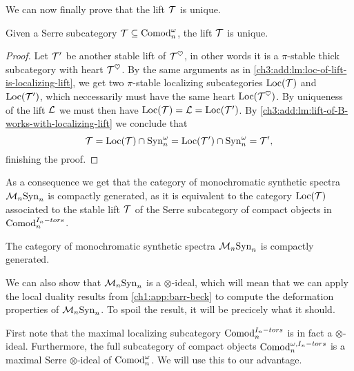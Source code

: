 We can now finally prove that the lift $\mathcal{T}$ is unique. 

\begin{theorem}
    \label{ch3:add:thm:uniqueness-of-lift}
    Given a Serre subcategory $\mathcal{T}\subseteq \mathrm{Comod}_n^\omega$, the lift $\mathcal{T}$ is unique. 
\end{theorem}
\begin{proof}
    Let $\mathcal{T}'$ be another stable lift of $\mathcal{T}^\heartsuit$, in other words it is a $\pi$-stable thick subcategory with heart $\mathcal{T}^\heartsuit$. By the same arguments as in \cref{ch3:add:lm:loc-of-lift-is-localizing-lift}, we get two $\pi$-stable localizing subcategories $\operatorname{Loc}(\mathcal{T})$ and $\operatorname{Loc}(\mathcal{T}')$, which neccessarily must have the same heart $\operatorname{Loc}(\mathcal{T}^\heartsuit)$. By uniqueness of the lift $\mathcal{L}$ we must then have $\operatorname{Loc}(\mathcal{T}) = \mathcal{L} = \operatorname{Loc}(\mathcal{T}')$. By \cref{ch3:add:lm:lift-of-B-works-with-localizing-lift} we conclude that 
    \[\mathcal{T} = \operatorname{Loc}(\mathcal{T})\cap \mathrm{Syn}_{n}^\omega = \operatorname{Loc}(\mathcal{T}')\cap \mathrm{Syn}_{n}^\omega = \mathcal{T}',\]
    finishing the proof. 
\end{proof}

As a consequence we get that the category of monochromatic synthetic spectra $\mathcal{M}_{n}\mathrm{Syn}_n$ is compactly generated, as it is equivalent to the category $\operatorname{Loc}(\mathcal{T})$ associated to the stable lift $\mathcal{T}$ of the Serre subcategory of compact objects in $\mathrm{Comod}_n^{I_n-tors}$. 

\begin{corollary}
    The category of monochromatic synthetic spectra $\mathcal{M}_{n}\mathrm{Syn}_n$ is compactly generated. 
\end{corollary}

We can also show that $\mathcal{M}_{n}\mathrm{Syn}_n$ is a $\otimes$-ideal, which will mean that we can apply the local duality results from \cref{ch1:app:barr-beck} to compute the deformation properties of $\mathcal{M}_{n}\mathrm{Syn}_n$. To spoil the result, it will be precicely what it should. 

First note that the maximal localizing subcategory $\mathrm{Comod}_n^{I_n-tors}$ is in fact a $\otimes$-ideal. Furthermore, the full subcategory of compact objects $\mathrm{Comod}_n^{\omega, I_n-tors}$ is a maximal Serre $\otimes$-ideal of $\mathrm{Comod}_n^\omega$. We will use this to our advantage. 

